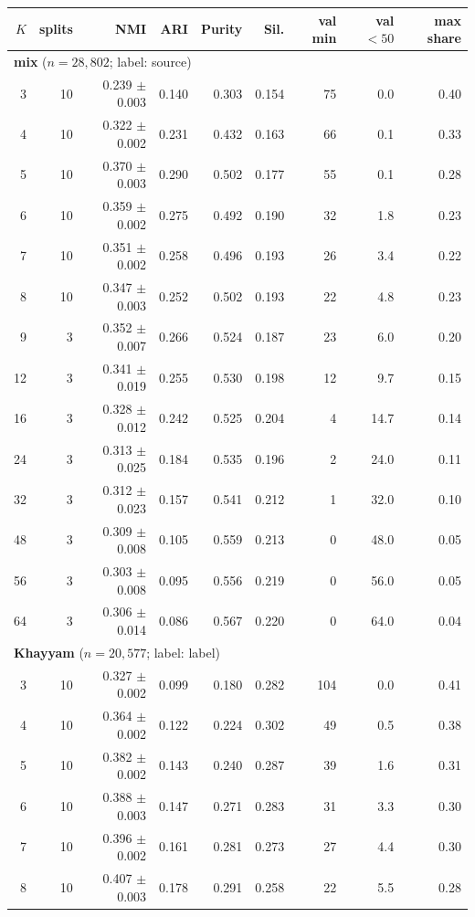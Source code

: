 \begin{longtable}{rrrrrrrrr}
\toprule
$K$ & splits & NMI & ARI & Purity & Sil. & val min & val $<50$ & max share \\
\midrule
\endhead
\multicolumn{9}{l}{\textbf{mix} ($n = 28,802$; label: source)} \\
\midrule
3 & 10 & 0.239 $\pm$ 0.003 & 0.140 & 0.303 & 0.154 & 75 & 0.0 & 0.40 \\
4 & 10 & 0.322 $\pm$ 0.002 & 0.231 & 0.432 & 0.163 & 66 & 0.1 & 0.33 \\
5 & 10 & 0.370 $\pm$ 0.003 & 0.290 & 0.502 & 0.177 & 55 & 0.1 & 0.28 \\
6 & 10 & 0.359 $\pm$ 0.002 & 0.275 & 0.492 & 0.190 & 32 & 1.8 & 0.23 \\
7 & 10 & 0.351 $\pm$ 0.002 & 0.258 & 0.496 & 0.193 & 26 & 3.4 & 0.22 \\
8 & 10 & 0.347 $\pm$ 0.003 & 0.252 & 0.502 & 0.193 & 22 & 4.8 & 0.23 \\
9 & 3 & 0.352 $\pm$ 0.007 & 0.266 & 0.524 & 0.187 & 23 & 6.0 & 0.20 \\
12 & 3 & 0.341 $\pm$ 0.019 & 0.255 & 0.530 & 0.198 & 12 & 9.7 & 0.15 \\
16 & 3 & 0.328 $\pm$ 0.012 & 0.242 & 0.525 & 0.204 & 4 & 14.7 & 0.14 \\
24 & 3 & 0.313 $\pm$ 0.025 & 0.184 & 0.535 & 0.196 & 2 & 24.0 & 0.11 \\
32 & 3 & 0.312 $\pm$ 0.023 & 0.157 & 0.541 & 0.212 & 1 & 32.0 & 0.10 \\
48 & 3 & 0.309 $\pm$ 0.008 & 0.105 & 0.559 & 0.213 & 0 & 48.0 & 0.05 \\
56 & 3 & 0.303 $\pm$ 0.008 & 0.095 & 0.556 & 0.219 & 0 & 56.0 & 0.05 \\
64 & 3 & 0.306 $\pm$ 0.014 & 0.086 & 0.567 & 0.220 & 0 & 64.0 & 0.04 \\
\midrule
\multicolumn{9}{l}{\textbf{Khayyam} ($n = 20,577$; label: label)} \\
\midrule
3 & 10 & 0.327 $\pm$ 0.002 & 0.099 & 0.180 & 0.282 & 104 & 0.0 & 0.41 \\
4 & 10 & 0.364 $\pm$ 0.002 & 0.122 & 0.224 & 0.302 & 49 & 0.5 & 0.38 \\
5 & 10 & 0.382 $\pm$ 0.002 & 0.143 & 0.240 & 0.287 & 39 & 1.6 & 0.31 \\
6 & 10 & 0.388 $\pm$ 0.003 & 0.147 & 0.271 & 0.283 & 31 & 3.3 & 0.30 \\
7 & 10 & 0.396 $\pm$ 0.002 & 0.161 & 0.281 & 0.273 & 27 & 4.4 & 0.30 \\
8 & 10 & 0.407 $\pm$ 0.003 & 0.178 & 0.291 & 0.258 & 22 & 5.5 & 0.28 \\

\end{longtable}
